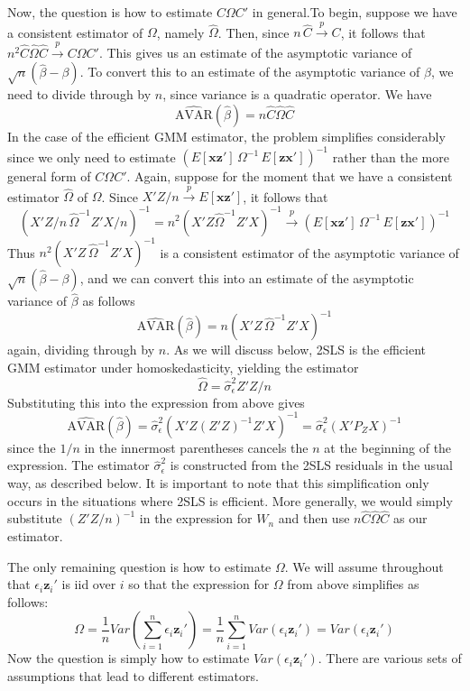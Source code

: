 \documentclass[12pt]{article}
\theoremstyle{definition}
\begin{document}
Now, the question is how to estimate $C\Omega C'$ in general.To begin, suppose we have a consistent estimator of $\Omega$, namely $\widehat{\Omega}$. Then, since $n\, \widehat{C} \overset{p}{\rightarrow} C$, it follows that $n^2 \widehat{C} \widehat{\Omega} \widehat{C}\overset{p}{\rightarrow}C\Omega C'$. This gives us an estimate of the asymptotic variance of $\sqrt{n}(\widehat{\beta} - \beta)$. To convert this to an estimate of the asymptotic variance of $\widehat{\beta}$, we need to divide through by $n$, since variance is a quadratic operator. We have
  $$\widehat{\mbox{AVAR}}(\widehat{\beta}) = n\widehat{C} \widehat{\Omega} \widehat{C}$$
In the case of the efficient GMM estimator, the problem simplifies considerably since we only need to estimate $ \left( E[\mathbf{x}\mathbf{z}']\, \Omega^{-1} \,E[\mathbf{z}\mathbf{x}'] \right)^{-1}$ rather than the more general form of $C\Omega C'$. Again, suppose for the moment that we have a consistent estimator $\widehat{\Omega}$ of $\Omega$. Since $X'Z/n \overset{p}{\rightarrow}E[\mathbf{x}\mathbf{z}']$, it follows that
  $$\left(X'Z/n  \,\widehat{\Omega}^{-1} Z'X/n\right)^{-1} = n^2 (X'Z \widehat{\Omega}^{-1} Z'X)^{-1} \overset{p}{\rightarrow}\left( E[\mathbf{x}\mathbf{z}']\, \Omega^{-1} \,E[\mathbf{z}\mathbf{x}'] \right)^{-1}$$
Thus $n^2\left(X'Z  \,\widehat{\Omega}^{-1} Z'X\right)^{-1}$ is a consistent estimator of the asymptotic variance of $\sqrt{n}(\widehat{\beta} - \beta)$, and we can convert this into an estimate of the asymptotic variance of $\widehat{\beta}$ as follows
  $$\widehat{\mbox{AVAR}}(\widehat{\beta}) = n \left(X'Z  \,\widehat{\Omega}^{-1} Z'X\right)^{-1} $$
again, dividing through by $n$. As we will discuss below, 2SLS is the efficient GMM estimator under homoskedasticity, yielding the estimator  
    $$\widehat{\Omega} = \widehat{\sigma}^2_\epsilon Z'Z/n$$
Substituting this into the expression from above gives
     $$\widehat{\mbox{AVAR}}(\widehat{\beta}) = \widehat{\sigma}^2_\epsilon \left(X'Z (Z'Z)^{-1} Z'X\right)^{-1}  = \widehat{\sigma}^2_\epsilon(X' P_Z X)^{-1}$$ 
since the $1/n$ in the innermost parentheses cancels the $n$ at the beginning of the expression. The estimator $\widehat{\sigma}^2_\epsilon$ is constructed from the 2SLS residuals in the usual way, as described below. It is important to note that this simplification only occurs in the situations where 2SLS is efficient. More generally, we would simply substitute $(Z'Z/n)^{-1}$ in the expression for $W_n$ and then use $n\widehat{C} \widehat{\Omega} \widehat{C}$ as our estimator.

The only remaining question is how to estimate $\Omega$. We will assume throughout that  $\epsilon_i \mathbf{z}_i'$ is iid over $i$ so that the expression for $\Omega$ from above simplifies as follows:
$$\Omega = \frac{1}{n} Var \left( \sum_{i=1}^n \epsilon_i \textbf{z}_i'\right) = \frac{1}{n} \sum_{i=1}^n Var(\epsilon_i \textbf{z}_i') = Var(\epsilon_i \textbf{z}_i')$$
Now the question is simply how to estimate $Var(\epsilon_i \textbf{z}_i')$. There are various sets of assumptions that lead to different estimators.
\end{document}
